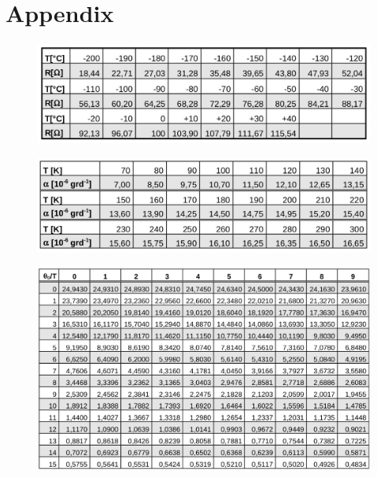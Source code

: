 \section*{Appendix}

\begin{figure}[H]
	\centering
	\includegraphics[width=0.6\linewidth]{content/graphics/resistance.jpg}
	\caption{\cite{molar_heat}}
	\label{fig:resistance}
\end{figure}

\begin{figure}[H]
	\centering
	\includegraphics[width=0.6\linewidth]{content/graphics/expansion.jpg}
	\caption{\cite{molar_heat}}
	\label{fig:expansion}
\end{figure}

\begin{figure}[H]
	\centering
	\includegraphics[width=0.8\linewidth]{content/graphics/ratio.jpg}
	\caption{\cite{molar_heat}}
	\label{fig:ratio}
\end{figure}

\centering

\null
\vfill
\vfill
\null
